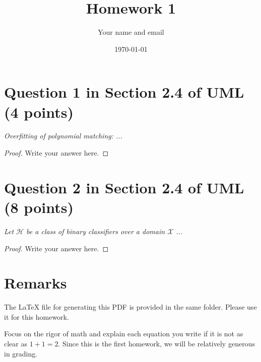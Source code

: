 \documentclass{article}
\title{Homework 1}
\author{Your name and email}
\date{\today}
\begin{document}
\maketitle

\section{Question 1 in Section 2.4 of UML (4 points)}
\emph{Overfitting of polynomial matching: ...}
\begin{proof}
    Write your answer here.
\end{proof}
\section{Question 2 in Section 2.4 of UML (8 points)}
\emph{Let $\mathcal{H}$ be a class of binary classifiers over a domain $\mathcal{X}$ ...}
\begin{proof}
    Write your answer here.
\end{proof}

\section{Remarks}
The \LaTeX{} file for generating this PDF is provided in the same folder. 
Please use it for this homework.

Focus on the rigor of math and explain each equation you write if it is not as clear as $1+1 = 2$.
Since this is the first homework,
we will be relatively generous in grading.
\end{document}
